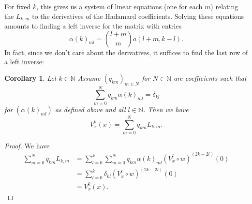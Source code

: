 \documentclass[11pt]{article}
\def\N{{\mathbb{N}}}
\newtheorem{cor}[df]{Corollary}
\begin{document}
For fixed $k$, this gives us a system of linear equations (one for each $m$) relating the $L_{k,m}$ to the derivatives of the Hadamard coefficients. Solving these equations amounts to finding a left inverse for the matrix with entries
\[\alpha(k)_{ml}=\binom{l+m}{m} a(l+m,k-l).\]
In fact, since we don't care about the derivatives, it suffices to find the last row of a left inverse:
\begin{cor}
	Let $k\in \N$ Assume $(q_{km})_{m\leq N}$ for $N\in \N$ are coefficients such that
	\[\sum\limits_{m=0}^Nq_{km}\alpha(k)_{ml}=\delta_{kl}\]
	for $(\alpha(k)_{ml})$ as defined above and all $l\in \N$. Then we have
	\[V^{k}_x(x)=\sum\limits_{m=0}^N q_{km}L_{k,m}.\]
\end{cor}
\begin{proof}
	We have
	\begin{align*}
		\sum\limits_{m=0}^N q_{km}L_{k,m}
		&=\sum\limits_{l=0}^k \sum\limits_{m=0}^N q_{km}\alpha(k)_{ml}\left(V^{l}_x\circ w\right)^{(2k-2l)}(0)\\
		&=\sum\limits_{l=0}^k \delta_{kl}\left(V^{l}_x\circ w\right)^{(2k-2l)}(0)\\
		&=V^{k}_x(x).
	\end{align*}
\end{proof}
\end{document}
